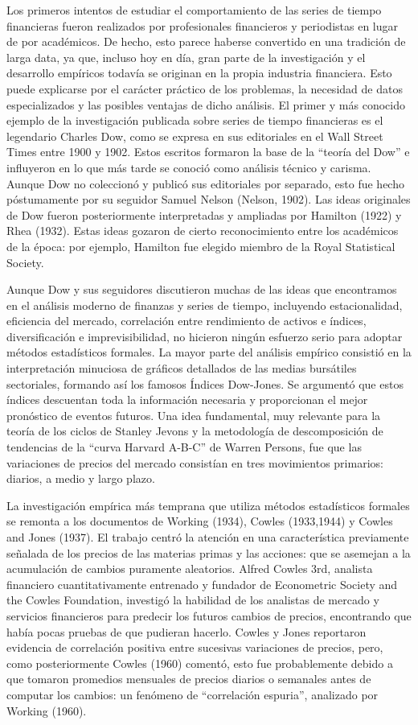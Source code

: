 \documentclass[12pt,]{krantz}
\theoremstyle{definition}
\theoremstyle{definition}
\theoremstyle{definition}
\theoremstyle{remark}
\begin{document}
Los primeros intentos de estudiar el comportamiento de las series de
tiempo financieras fueron realizados por profesionales financieros y
periodistas en lugar de por académicos. De hecho, esto parece haberse
convertido en una tradición de larga data, ya que, incluso hoy en día,
gran parte de la investigación y el desarrollo empíricos todavía se
originan en la propia industria financiera. Esto puede explicarse por el
carácter práctico de los problemas, la necesidad de datos especializados
y las posibles ventajas de dicho análisis. El primer y más conocido
ejemplo de la investigación publicada sobre series de tiempo financieras
es el legendario Charles Dow, como se expresa en sus editoriales en el
Wall Street Times entre 1900 y 1902. Estos escritos formaron la base de
la ``teoría del Dow'' e influyeron en lo que más tarde se conoció como
análisis técnico y carisma. Aunque Dow no coleccionó y publicó sus
editoriales por separado, esto fue hecho póstumamente por su seguidor
Samuel Nelson (Nelson, 1902). Las ideas originales de Dow fueron
posteriormente interpretadas y ampliadas por Hamilton (1922) y Rhea
(1932). Estas ideas gozaron de cierto reconocimiento entre los
académicos de la época: por ejemplo, Hamilton fue elegido miembro de la
Royal Statistical Society.

Aunque Dow y sus seguidores discutieron muchas de las ideas que
encontramos en el análisis moderno de finanzas y series de tiempo,
incluyendo estacionalidad, eficiencia del mercado, correlación entre
rendimiento de activos e índices, diversificación e imprevisibilidad, no
hicieron ningún esfuerzo serio para adoptar métodos estadísticos
formales. La mayor parte del análisis empírico consistió en la
interpretación minuciosa de gráficos detallados de las medias bursátiles
sectoriales, formando así los famosos Índices Dow-Jones. Se argumentó
que estos índices descuentan toda la información necesaria y
proporcionan el mejor pronóstico de eventos futuros. Una idea
fundamental, muy relevante para la teoría de los ciclos de Stanley
Jevons y la metodología de descomposición de tendencias de la ``curva
Harvard A-B-C'' de Warren Persons, fue que las variaciones de precios
del mercado consistían en tres movimientos primarios: diarios, a medio y
largo plazo.

La investigación empírica más temprana que utiliza métodos estadísticos
formales se remonta a los documentos de Working (1934), Cowles
(1933,1944) y Cowles and Jones (1937). El trabajo centró la atención en
una característica previamente señalada de los precios de las materias
primas y las acciones: que se asemejan a la acumulación de cambios
puramente aleatorios. Alfred Cowles 3rd, analista financiero
cuantitativamente entrenado y fundador de Econometric Society and the
Cowles Foundation, investigó la habilidad de los analistas de mercado y
servicios financieros para predecir los futuros cambios de precios,
encontrando que había pocas pruebas de que pudieran hacerlo. Cowles y
Jones reportaron evidencia de correlación positiva entre sucesivas
variaciones de precios, pero, como posteriormente Cowles (1960) comentó,
esto fue probablemente debido a que tomaron promedios mensuales de
precios diarios o semanales antes de computar los cambios: un fenómeno
de ``correlación espuria'', analizado por Working (1960).
\end{document}
